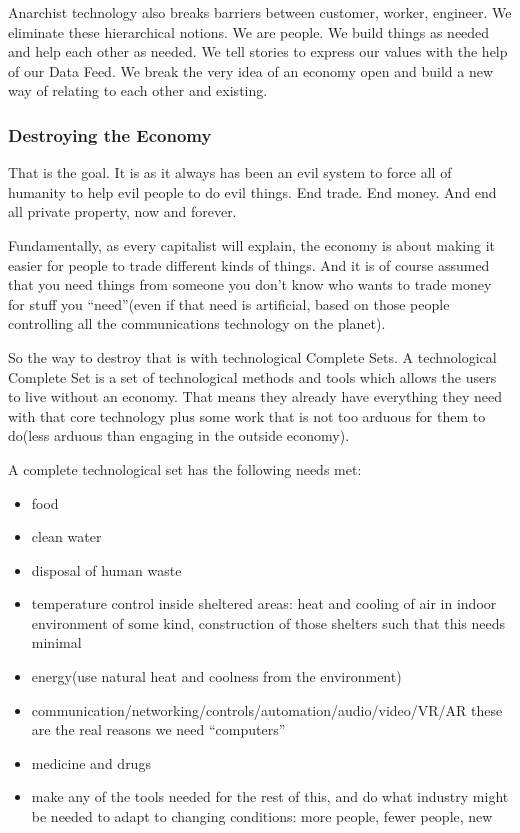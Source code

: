 Anarchist technology also breaks barriers between customer, worker,
engineer. We eliminate these hierarchical notions. We are people. We
build things as needed and help each other as needed. We tell stories to
express our values with the help of our Data Feed. We break the very
idea of an economy open and build a new way of relating to each other
and existing.

\subsubsection{Destroying the Economy}\label{destroying-the-economy}

That is the goal. It is as it always has been an evil system to force
all of humanity to help evil people to do evil things. End trade. End
money. And end all private property, now and forever.

Fundamentally, as every capitalist will explain, the economy is about
making it easier for people to trade different kinds of things. And it
is of course assumed that you need things from someone you don't know
who wants to trade money for stuff you ``need''(even if that need is
artificial, based on those people controlling all the communications
technology on the planet).

So the way to destroy that is with technological Complete Sets. A
technological Complete Set is a set of technological methods and tools
which allows the users to live without an economy. That means they
already have everything they need with that core technology plus some
work that is not too arduous for them to do(less arduous than engaging
in the outside economy).

A complete technological set has the following needs met:

\begin{itemize}
\tightlist
\item
  food
\item
  clean water
\item
  disposal of human waste
\item
  temperature control inside sheltered areas: heat and cooling of air in
  indoor environment of some kind, construction of those shelters such
  that this needs minimal\\
\item
  energy(use natural heat and coolness from the environment)
\item
  communication/networking/controls/automation/audio/video/VR/AR these
  are the real reasons we need ``computers''
\item
  medicine and drugs
\item
  make any of the tools needed for the rest of this, and do what
  industry might be needed to adapt to changing conditions: more people,
  fewer people, new
\end{itemize}

